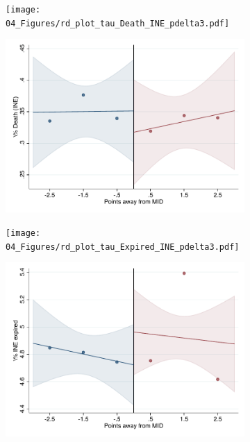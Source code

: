 \documentclass[oneside,11pt]{article}
\begin{document}
\begin{figure}[H]

    \ContinuedFloat
    \caption{(Cont.) RD plots for outcome variables across those assigned to either UNAM or IPN high-school, and those who are not\label{fig:ITT_rd_plot_elite_4}}
    \begin{center}
    
    \begin{subfigure}{0.475\textwidth}
        \centering
        \texttt{[image: 04\_Figures/rd\_plot\_tau\_Death\_INE\_pdelta3.pdf]}
    \end{subfigure}
    \begin{subfigure}{0.475\textwidth}
        \centering
        \includegraphics[width=\textwidth]{04_Figures/rd_plot_mid_Death_INE_pdelta3.pdf}
    \end{subfigure}

    \begin{subfigure}{0.475\textwidth}
        \centering
        \texttt{[image: 04\_Figures/rd\_plot\_tau\_Expired\_INE\_pdelta3.pdf]}
    \end{subfigure}
    \begin{subfigure}{0.475\textwidth}
        \centering
        \includegraphics[width=\textwidth]{04_Figures/rd_plot_mid_Expired_INE_pdelta3.pdf}
    \end{subfigure}


\end{center}
\end{figure}
\end{document}
